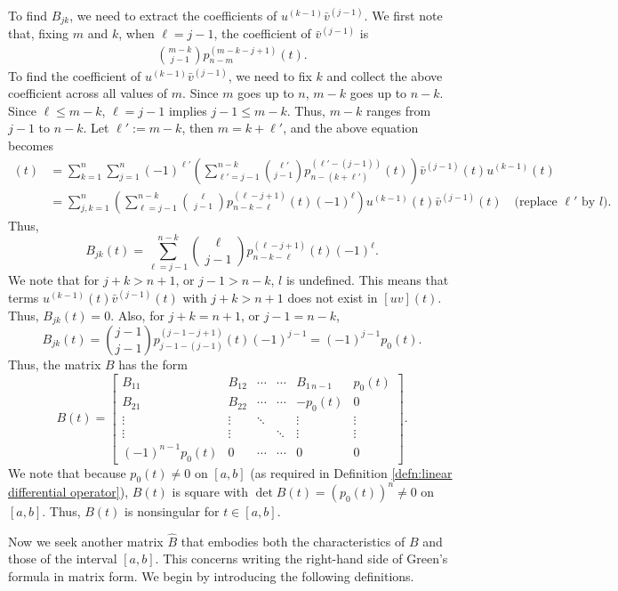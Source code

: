 \documentclass[11pt, oneside, a4paper]{article}
\begin{document}
To find $B_{jk}$, we need to extract the coefficients of $u^{(k-1)}\bar{v}^{(j-1)}$. We first note that, fixing $m$ and $k$, when $\ell=j-1$, the coefficient of $\bar{v}^{(j-1)}$ is
\begin{align*}
    \binom{m-k}{j-1}p_{n-m}^{(m-k-j+1)}(t).
\end{align*}
To find the coefficient of $u^{(k-1)}\bar{v}^{(j-1)}$, we need to fix $k$ and collect the above coefficient across all values of $m$. Since $m$ goes up to $n$, $m-k$ goes up to $n-k$. Since $\ell\leq m-k$, $\ell=j-1$ implies $j-1\leq m-k$. Thus, $m-k$ ranges from $j-1$ to $n-k$. Let $\ell':=m-k$, then $m=k+\ell'$, and the above equation becomes
\begin{align*}
    [uv](t) 
    &= \sum_{k=1}^n\sum_{j=1}^n (-1)^{\ell'}\left(\sum_{\ell'=j-1}^{n-k}\binom{\ell'}{j-1}p_{n-(k+\ell')}^{(\ell'-(j-1))}(t)\right)\bar{v}^{(j-1)}(t)u^{(k-1)}(t)\\
    &= \sum_{j,k=1}^n \left(\sum_{\ell=j-1}^{n-k}\binom{\ell}{j-1}p^{(\ell-j+1)}_{n-k-\ell}(t)(-1)^\ell\right)u^{(k-1)}(t)\bar{v}^{(j-1)}(t)\quad\mbox{(replace $\ell'$ by $l$)}.
\end{align*}
Thus,
\[B_{jk}(t) = \sum_{\ell=j-1}^{n-k}\binom{\ell}{j-1}p^{(\ell-j+1)}_{n-k-\ell}(t)(-1)^\ell.\]
We note that for $j+k>n+1$, or $j-1>n-k$, $l$ is undefined. This means that terms $u^{(k-1)}(t)\bar{v}^{(j-1)}(t)$ with $j+k>n+1$ does not exist in $[uv](t)$. Thus, $B_{jk}(t)=0$. Also, for $j+k=n+1$, or $j-1=n-k$,
\[B_{jk}(t) = \binom{j-1}{j-1}p^{(j-1-j+1)}_{j-1-(j-1)}(t)(-1)^{j-1} = (-1)^{j-1}p_0(t).\] 
Thus, the matrix $B$ has the form
\begin{equation}\label{eq:B(t)}
    B(t)=\begin{bmatrix}
        B_{11} & B_{12} & \cdots & \cdots & B_{1\,n-1} & p_0(t)\\
        B_{21} & B_{22} & \cdots & \cdots & -p_0(t) & 0\\
        \vdots & \vdots & \ddots &  & \vdots & \vdots\\
        \vdots & \vdots &  & \ddots & \vdots & \vdots\\
        (-1)^{n-1}p_0(t) & 0 & \cdots & \cdots & 0 & 0
    \end{bmatrix}.
\end{equation}
We note that because $p_0(t)\neq 0$ on $[a,b]$ (as required in Definition \ref{defn:linear differential operator}), $B(t)$ is square with $\det B(t)=(p_0(t))^n\neq 0$ on $[a,b]$. Thus, $B(t)$ is nonsingular for $t\in [a,b]$.


Now we seek another matrix $\hat{B}$ that embodies both the characteristics of $B$ and those of the interval $[a,b]$. This concerns writing the right-hand side of Green's formula in matrix form. We begin by introducing the following definitions.
\end{document}
